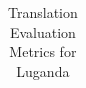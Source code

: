 \begin{table}
    \caption{Translation Evaluation Metrics for Luganda}
    \label{tab:luganda_eval}
    \begin{tabular}{lrrrrrrrr}
        \toprule                                                                                                                                                                                                                                                                                                                                                                                                                                                                                                                                                                                                                                                                                                                                                                                                                                                                                                                                                                                                                                                                                                                                                                                                                                                                                                                                                                                                                                                                                                                                                                                                                                                                                                                                                                                                                                                                                                                                                                                                                                                                                                                                                                                                                                                                                                                                                                                                                                                                                                                                                                                                                                                                                                                                                                                                                                                                                                                                                                                                                                                                                                                                                                                     
\end{tabular}
\end{table}
